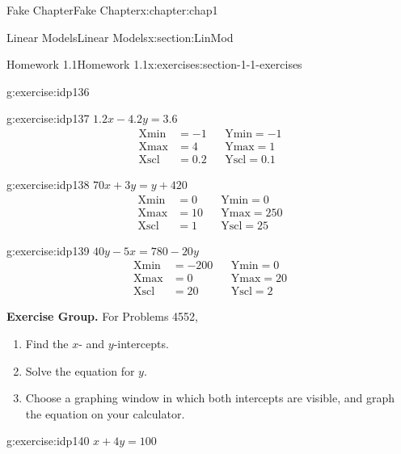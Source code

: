 \documentclass[oneside,10pt,]{book}
\numberwithin{equation}{section}
\newcommand{\amp}{&}
\begin{document}
\begin{chapterptx}{Fake Chapter}{}{Fake Chapter}{}{}{x:chapter:chap1}
\begin{sectionptx}{Linear Models}{}{Linear Models}{}{}{x:section:LinMod}
\begin{exercises-subsection}{Homework 1.1}{}{Homework 1.1}{}{}{x:exercises:section-1-1-exercises}
\begin{exercisegroupcol}{2}
\begin{divisionexerciseegcol}{41}{}{}{g:exercise:idp136}
%
\end{divisionexerciseegcol}%
\begin{divisionexerciseegcol}{42}{}{}{g:exercise:idp137}%
\(1.2x - 4.2y = 3.6\)%
\begin{align*}
{\text{Xmin}} \amp = -1 \amp\amp {\text{Ymin}} = -1\\
{\text{Xmax}} \amp = 4 \amp\amp {\text{Ymax}} = 1\\
{\text{Xscl}} \amp = 0.2 \amp\amp {\text{Yscl}} = 0.1
\end{align*}
%
\end{divisionexerciseegcol}%
\begin{divisionexerciseegcol}{43}{}{}{g:exercise:idp138}%
\(70x + 3y = y + 420\)%
\begin{align*}
{\text{Xmin}} \amp = 0 \amp\amp {\text{Ymin}} = 0\\
{\text{Xmax}} \amp = 10 \amp\amp {\text{Ymax}} = 250\\
{\text{Xscl}} \amp = 1 \amp\amp {\text{Yscl}} = 25
\end{align*}
%
\end{divisionexerciseegcol}%
\begin{divisionexerciseegcol}{44}{}{}{g:exercise:idp139}%
\(40y - 5x = 780 - 20y\)%
\begin{align*}
{\text{Xmin}} \amp = -200 \amp\amp {\text{Ymin}} = 0\\
{\text{Xmax}} \amp = 0 \amp\amp {\text{Ymax}} = 20\\
{\text{Xscl}} \amp = 20 \amp\amp {\text{Yscl}} = 2
\end{align*}
%
\end{divisionexerciseegcol}%
\end{exercisegroupcol}
\par\medskip\noindent
\par\medskip\noindent%
\textbf{Exercise Group.}\space\space%
For Problems 45\textendash{}52,%
\begin{enumerate}[label=\alph*]
\item{}Find the \(x\)- and \(y\)-intercepts.%
\item{}Solve the equation for \(y\).%
\item{}Choose a graphing window in which both intercepts are visible, and graph the equation on your calculator.%
\end{enumerate}
%
\begin{exercisegroupcol}{2}
\begin{divisionexerciseegcol}{45}{}{}{g:exercise:idp140}%
\(x + 4y = 100\)%
\end{divisionexerciseegcol}%

\end{exercisegroupcol}
\end{exercises-subsection}
\end{sectionptx}
\end{chapterptx}
\end{document}
